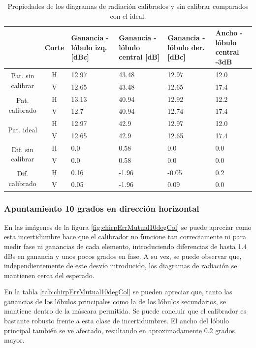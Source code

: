 \begin{table}[H]
  \footnotesize
  \centering
  \begin{tabular}{|c|c|p{2cm}|p{2.5cm}|p{2.5cm}|p{2.5cm}|}
    \cline{2-6}
    \multicolumn{1}{c|}{} & Corte & Ganancia - lóbulo izq. [dBc] & Ganancia - lóbulo central [dB] &
    Ganancia - lóbulo der. [dBc] & Ancho - lóbulo central -3dB \tabularnewline\hline
    \multirow{2}{2cm}{Pat. sin calibrar} & H & 12.97 & 43.48 & 12.97 & 12.0 \tabularnewline\cline{2-6}
     & V & 12.65 & 43.48 & 12.65 & 17.4 \tabularnewline\hline
    \multirow{2}{2cm}{Pat. calibrado} & H & 13.13 & 40.94 & 12.92 & 12.2 \tabularnewline\cline{2-6}
     & V & 12.7 & 40.94 & 12.74 & 17.4 \tabularnewline\hline
    \multirow{2}{2cm}{Pat. ideal} & H & 12.97 & 42.9 & 12.97 & 12.0 \tabularnewline\cline{2-6}
     & V & 12.65 & 42.9 & 12.65 & 17.4 \tabularnewline\hline
    \multirow{2}{2cm}{Dif. sin calibrar} & H & 0.0 & 0.58 & 0.0 & 0.0\tabularnewline\cline{2-6}
     & V & 0.0 & 0.58 & 0.0 & 0.0 \tabularnewline\hline
    \multirow{2}{2cm}{Dif. calibrado} & H & 0.16 & -1.96 & -0.05 & 0.2 \tabularnewline\cline{2-6}
     & V & 0.05 & -1.96 & 0.09 & 0.0 \tabularnewline\hline
  \end{tabular}
  \caption{Propiedades de los diagramas de radiación calibrados y sin calibrar comparados con el ideal.}
  \label{tab:chirpErrMutual0deg}
\end{table}


\subsubsection{Apuntamiento 10 grados en dirección horizontal}

En las imágenes de la figura \ref{fig:chirpErrMutual10degCol} se puede apreciar como esta incertidumbre hace que el calibrador 
no funcione tan correctamente ni para medir fase ni ganancias de cada elemento, introduciendo diferencias de hasta 1.4 dBs en 
ganancia y unos pocos grados en fase. A su vez, se puede observar que, independientemente de este desvío introducido, los diagramas de 
radiación se mantienen cerca del esperado.

En la tabla \ref{tab:chirpErrMutual10degCol} se pueden apreciar que, tanto las ganancias de los lóbulos principales como la de 
los lóbulos secundarios, se mantiene dentro de la máscara permitida. Se puede concluir que el calibrador es bastante robusto 
frente a esta clase de incertidumbres. El ancho del lóbulo principal también se ve afectado, resultando en aproximadamente 0.2
grados mayor.

